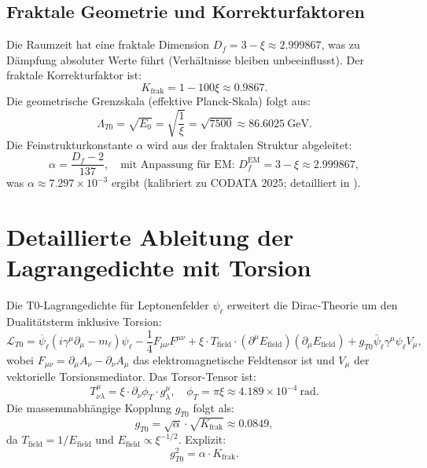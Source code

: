 \documentclass[12pt,a4paper]{article}
\begin{document}
	\subsection{Fraktale Geometrie und Korrekturfaktoren}
	Die Raumzeit hat eine fraktale Dimension $D_f = 3 - \xi \approx 2.999867$, was zu Dämpfung absoluter Werte führt (Verhältnisse bleiben unbeeinflusst). Der fraktale Korrekturfaktor ist:
	\begin{equation}
		K_{\text{frak}} = 1 - 100 \xi \approx 0.9867.
	\end{equation}
	Die geometrische Grenzskala (effektive Planck-Skala) folgt aus:
	\begin{equation}
		\Lambda_{T0} = \sqrt{E_0} = \sqrt{\frac{1}{\xi}} = \sqrt{7500} \approx \SI{86.6025}{\giga\electronvolt}.
	\end{equation}
	Die Feinstrukturkonstante $\alpha$ wird aus der fraktalen Struktur abgeleitet:
	\begin{equation}
		\alpha = \frac{D_f - 2}{137}, \quad \text{mit Anpassung für EM: } D_f^\text{EM} = 3 - \xi \approx 2.999867,
	\end{equation}
	was $\alpha \approx 7.297 \times 10^{-3}$ ergibt (kalibriert zu CODATA 2025; detailliert in \cite{T0_fine_structure}).
	
	\section{Detaillierte Ableitung der Lagrangedichte mit Torsion}
	Die T0-Lagrangedichte für Leptonenfelder $\psi_\ell$ erweitert die Dirac-Theorie um den Dualitätsterm inklusive Torsion:
	\begin{equation}
		\mathcal{L}_{T0} = \overline{\psi}_\ell (i \gamma^\mu \partial_\mu - m_\ell) \psi_\ell - \frac{1}{4} F_{\mu\nu} F^{\mu\nu} + \xi \cdot T_{\text{field}} \cdot (\partial^\mu E_{\text{field}}) (\partial_\mu E_{\text{field}}) + g_{T0} \bar{\psi}_\ell \gamma^\mu \psi_\ell V_\mu,
	\end{equation}
	wobei $F_{\mu\nu} = \partial_\mu A_\nu - \partial_\nu A_\mu$ das elektromagnetische Feldtensor ist und $V_\mu$ der vektorielle Torsionsmediator. Das Torsor-Tensor ist:
	\begin{equation}
		T^\mu_{\nu\lambda} = \xi \cdot \partial_\nu \phi_T \cdot g_{\lambda}^\mu, \quad \phi_T = \pi \xi \approx 4.189 \times 10^{-4}\ \text{rad}.
	\end{equation}
	Die massenunabhängige Kopplung $g_{T0}$ folgt als:
	\begin{equation}
		g_{T0} = \sqrt{\alpha} \cdot \sqrt{K_{\text{frak}}} \approx 0.0849,
	\end{equation}
	da $T_{\text{field}} = 1 / E_{\text{field}}$ und $E_{\text{field}} \propto \xi^{-1/2}$. Explizit:
	\begin{equation}
		g_{T0}^2 = \alpha \cdot K_{\text{frak}}.
	\end{equation}
	
\end{document}
